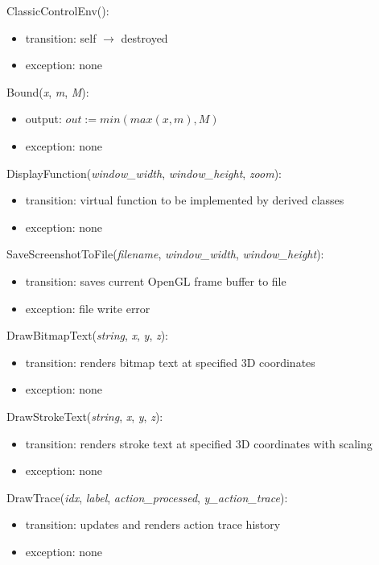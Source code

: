 \documentclass[12pt, titlepage]{article}
\begin{document}
\noindent \texttildelow ClassicControlEnv():
\begin{itemize}
  \item transition: self $\rightarrow$ destroyed
  \item exception: none
\end{itemize}

\noindent Bound(\textit{x}, \textit{m}, \textit{M}):
\begin{itemize}
  \item output: $out := min(max(x, m), M)$
  \item exception: none
\end{itemize}

\noindent DisplayFunction(\textit{window\_width}, \textit{window\_height}, \textit{zoom}):
\begin{itemize}
\item transition: virtual function to be implemented by derived classes
\item exception: none
\end{itemize}

\noindent SaveScreenshotToFile(\textit{filename}, \textit{window\_width}, \textit{window\_height}):
\begin{itemize}
\item transition: saves current OpenGL frame buffer to file
\item exception: file write error
\end{itemize}

\noindent DrawBitmapText(\textit{string}, \textit{x}, \textit{y}, \textit{z}):
\begin{itemize}
\item transition: renders bitmap text at specified 3D coordinates
\item exception: none
\end{itemize}

\noindent DrawStrokeText(\textit{string}, \textit{x}, \textit{y}, \textit{z}):
\begin{itemize}
\item transition: renders stroke text at specified 3D coordinates with scaling
\item exception: none
\end{itemize}

\noindent DrawTrace(\textit{idx}, \textit{label}, \textit{action\_processed}, \textit{y\_action\_trace}):
\begin{itemize}
\item transition: updates and renders action trace history
\item exception: none
\end{itemize}
\end{document}
